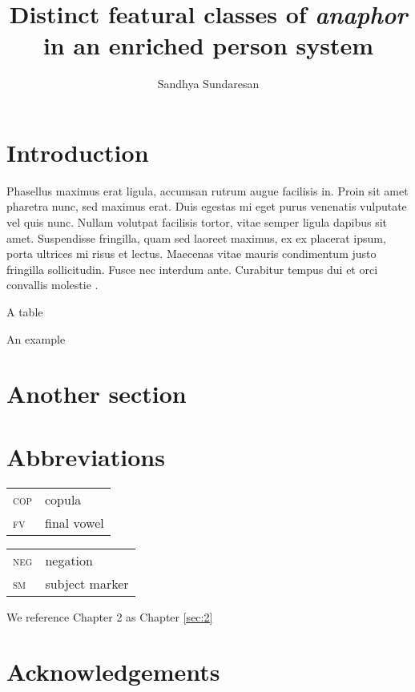 \documentclass[output=minimal]{../../langscibook}
\title[]{Distinct featural classes of \textit{anaphor} in an enriched person system}
\author{%
 Sandhya Sundaresan  \affiliation{Universität Leipzig}
}
\begin{document}
\maketitle


\section{Introduction}
Phasellus maximus erat ligula, accumsan rutrum augue facilisis in. Proin sit amet pharetra nunc, sed maximus erat. Duis egestas mi eget purus venenatis vulputate vel quis nunc. Nullam volutpat facilisis tortor, vitae semper ligula dapibus sit amet. Suspendisse fringilla, quam sed laoreet maximus, ex ex placerat ipsum, porta ultrices mi risus et lectus. Maecenas vitae mauris condimentum justo fringilla sollicitudin. Fusce nec interdum ante. Curabitur tempus dui et orci convallis molestie \citep{Chomsky1957}. 

\kant[1-4]

\begin{table}
\caption{A table}
\end{table}


\ea An example \z

\section{Another section}

\section*{Abbreviations}
\begin{tabularx}{.45\textwidth}{lX}
\textsc{cop} & copula\\
\textsc{fv} & final vowel\\
\end{tabularx}
\begin{tabularx}{.45\textwidth}{lX}
\textsc{neg} & negation\\
\textsc{sm} & subject marker\\
\end{tabularx}

We reference Chapter 2 as Chapter \ref{sec:2}

\section*{Acknowledgements}

{\sloppy
\printbibliography[heading=subbibliography,notkeyword=this]
}
\end{document}
